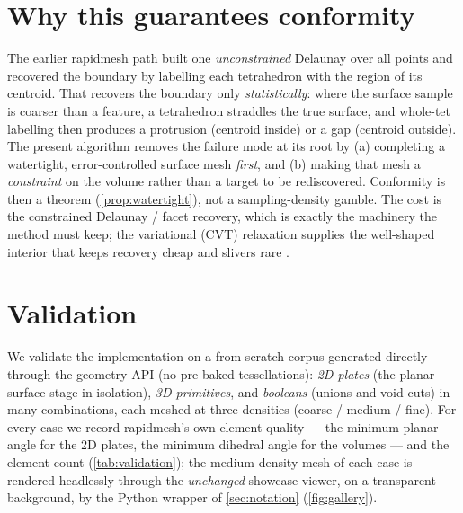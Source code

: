 \documentclass[11pt,a4paper]{article}
\numberwithin{equation}{section}
\begin{document}
\section{Why this guarantees conformity}
\label{sec:conformity}
The earlier rapidmesh path built one \emph{unconstrained} Delaunay over all
points and recovered the boundary by labelling each tetrahedron with the region
of its centroid. That recovers the boundary only \emph{statistically}: where the
surface sample is coarser than a feature, a tetrahedron straddles the true
surface, and whole-tet labelling then produces a protrusion (centroid inside) or
a gap (centroid outside). The present algorithm removes the failure mode at its
root by (a) completing a watertight, error-controlled surface mesh
\emph{first}, and (b) making that mesh a \emph{constraint} on the volume rather
than a target to be rediscovered. Conformity is then a theorem
(\cref{prop:watertight}), not a sampling-density gamble. The cost is the
constrained Delaunay / facet recovery, which is exactly the machinery the method
must keep; the variational (CVT) relaxation supplies the well-shaped interior
that keeps recovery cheap and slivers rare
\cite{AlliezCohenSteiner2005,TournoisAlliez2009}.

\section{Validation}
\label{sec:validation}
We validate the implementation on a from-scratch corpus generated directly
through the geometry API (no pre-baked tessellations): \emph{2D plates} (the
planar surface stage in isolation), \emph{3D primitives}, and \emph{booleans}
(unions and void cuts) in many combinations, each meshed at three densities
(coarse / medium / fine). For every case we record rapidmesh's own element
quality --- the minimum planar angle for the 2D plates, the minimum dihedral
angle for the volumes --- and the element count (\cref{tab:validation}); the
medium-density mesh of each case is rendered headlessly through the
\emph{unchanged} showcase viewer, on a transparent background, by the Python
wrapper of \cref{sec:notation} (\cref{fig:gallery}).
\end{document}
